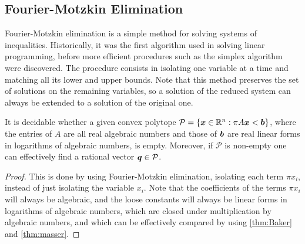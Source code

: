 \subsection{Fourier-Motzkin Elimination}

Fourier-Motzkin elimination is a simple method for solving systems of
inequalities. Historically, it was the first algorithm used in solving
linear programming, before more efficient procedures such as the
simplex algorithm were discovered. The procedure consists in isolating one
variable at a time and matching all its lower and upper bounds. Note
that this method preserves the set of solutions on the remaining
variables, so a solution of the reduced system can always be extended
to a solution of the original one.

\begin{theorem}
\label{thm:fme}
  It is decidable whether a
  given convex polytope
  $\mathcal{P} = \lbrace \boldsymbol{x} \in \mathbb{R}^{n} : \pi
  A\boldsymbol{x} < \boldsymbol{b} \rbrace$,
  where the entries of $A$ are all real algebraic numbers and
  those of $\boldsymbol{b}$ are real linear forms in logarithms of
  algebraic numbers, is empty.  Moreover, if $\mathcal{P}$ is
  non-empty one can effectively find a rational vector
  $\boldsymbol{q} \in \mathcal{P}$.
\end{theorem}

\begin{proof}
This is done by using Fourier-Motzkin elimination, isolating each term $\pi x_{i}$, instead of just isolating the variable $x_{i}$. Note that the coefficients of the terms $\pi x_{i}$ will always be algebraic, and the loose constants will always be linear forms in logarithms of algebraic numbers, which are closed under multiplication by algebraic numbers, and which can be effectively compared by using \cref{thm:Baker} and \cref{thm:masser}.
\end{proof}
